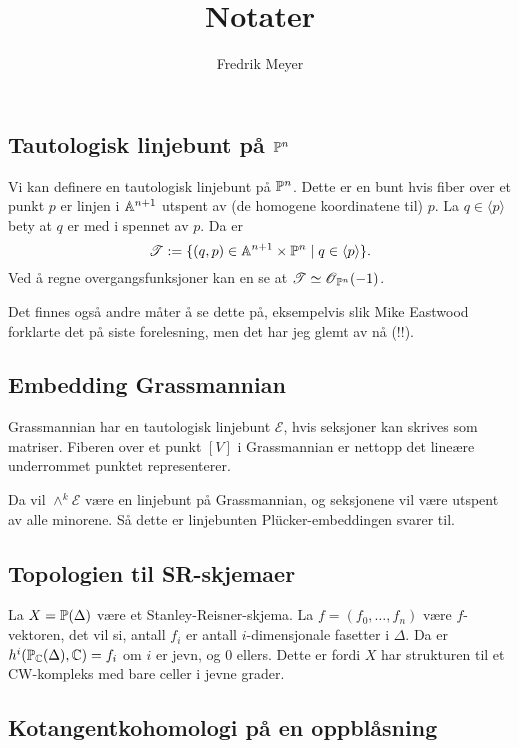 \documentclass[11pt, norsk]{article}
\begin{document}
\title{Notater}
\author{Fredrik Meyer}
\maketitle 

\subsection{Tautologisk linjebunt på $\mathbb{P}^n$}

Vi kan definere en tautologisk linjebunt på $\mathbb{P}^n$. Dette er en bunt hvis fiber over et punkt $p$ er linjen i $\mathbb{A}^{n+1}$ utspent av (de homogene koordinatene til) $p$. La $q \in \langle p \rangle$ bety at $q$ er med i spennet av $p$. Da er
$$
\mathscr T := \{ (q,p) \in \mathbb{A}^{n+1} \times \mathbb{P}^n \mid q \in \langle p \rangle \}.
$$
Ved å regne overgangsfunksjoner kan en se at $\mathscr T \simeq \operatorname{\mathscr{O}}_{\mathbb{P}^n}(-1)$.

Det finnes også andre måter å se dette på, eksempelvis slik Mike Eastwood forklarte det på siste forelesning, men det har jeg glemt av nå (!!). 

\subsection{Embedding Grassmannian}

Grassmannian har en tautologisk linjebunt $\mathscr E$, hvis seksjoner kan skrives som matriser. Fiberen over et punkt $[V]$ i Grassmannian er nettopp det lineære underrommet punktet representerer.

Da vil $\wedge^k \mathscr E$ være en linjebunt på Grassmannian, og seksjonene vil være utspent av alle minorene. Så dette er linjebunten Plücker-embeddingen svarer til.

\subsection{Topologien til SR-skjemaer}

La $X=\mathbb{P}(\Delta)$ være et Stanley-Reisner-skjema. La $f=(f_0,\ldots,f_n)$ være $f$-vektoren, det vil si, antall $f_i$ er antall $i$-dimensjonale fasetter i $\Delta$. Da er $h^i(\mathbb{P}_{\mathbb{C}}(\Delta),\mathbb{C})=f_i$ om $i$ er jevn, og $0$ ellers. Dette er fordi $X$ har strukturen til et CW-kompleks med bare celler i jevne grader.

\subsection{Kotangentkohomologi på en oppblåsning}
\end{document}
